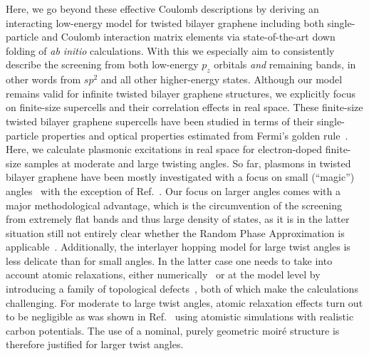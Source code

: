 Here, we go beyond these effective Coulomb descriptions by deriving an interacting low-energy model for twisted bilayer graphene including both single-particle and Coulomb interaction matrix elements via state-of-the-art down folding of \textit{ab initio} calculations.  With this we especially aim to consistently describe the screening from both low-energy $p_z$ orbitals \emph{and} remaining bands, in other words from $sp^2$ and all other higher-energy states.  Although our model remains valid for infinite twisted bilayer graphene structures, we explicitly focus on finite-size supercells and their correlation effects in real space. These finite-size twisted bilayer graphene supercells have been studied in terms of their single-particle properties and optical properties estimated from Fermi's golden rule~\cite{mirzakhani2020circular,tepliakov2020twisted}. Here, we calculate plasmonic excitations in real space for electron-doped finite-size samples at moderate and large twisting angles. So far, plasmons in twisted bilayer graphene have been mostly investigated with a focus on small (``magic'') angles~\cite{sunku_photonic_2018,lewandowski_intrinsically_2019,Hesp_2021_Observation_of,novelli_optical_2020,kuang2021collective} with the exception of Ref.~\cite{hu_real-space_2017}.  Our focus on larger angles comes with a major methodological advantage, which is the circumvention of the screening from extremely flat bands and thus large density of states, as it is in the latter situation still not entirely clear whether the Random Phase Approximation is applicable~\cite{katsnelson_anomalies_1985,irkhin_robustness_2002,stepanov_coexisting_2021}. Additionally, the interlayer hopping model for large twist angles is less delicate than for small angles. In the latter case one needs to take into account atomic relaxations, either numerically~\cite{shi_large-area_2020} or at the model level by introducing a family of topological defects~\cite{gornostyrev_origin_2020}, both of which make the calculations challenging. For moderate to large twist angles, atomic relaxation effects turn out to be negligible as was shown in Ref.~\cite{wijk_relaxation_2015} using atomistic simulations with realistic carbon potentials. The use of a nominal, purely geometric moir{\'e} structure is therefore justified for larger twist angles. 
    
